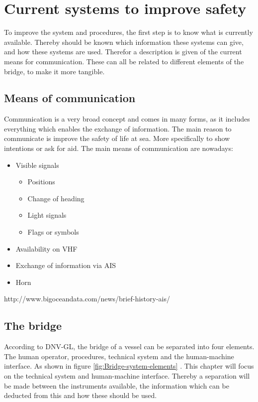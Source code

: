 \chapter{Current systems to improve safety}
\label{ch:systems}
To improve the system and procedures, the first step is to know what is currently available. Thereby should be known which information these systems can give, and how these systems are used. Therefor a description is given of the current means for communication. These can all be related to different elements of the bridge, to make it more tangible.

\section{Means of communication}
Communication is a very broad concept and comes in many forms, as it includes everything which enables the exchange of information. The main reason to communicate is improve the safety of life at sea. More specifically to show intentions or ask for aid. The main means of communication are nowadays:

\begin{itemize}
	\item Visible signals
	\begin{itemize}
		\item Positions
		\item Change of heading
		\item Light signals
		\item Flags or symbols
	\end{itemize}
	\item Availability on \ac{VHF}
	\item Exchange of information via \ac{AIS}
	\item Horn
\end{itemize}

http://www.bigoceandata.com/news/brief-history-ais/

\section{The bridge}
According to DNV-GL, the bridge of a vessel can be separated into four elements. The human operator, procedures,
technical system and the human-machine interface. As shown in figure \ref{fig:Bridge-system-elements} \cite{DNVGL2011}. This chapter will focus on the technical system and human-machine interface. Thereby a separation will be made between the instruments available, the information which can be deducted from this and how these should be used. 

